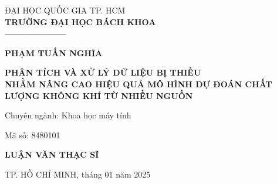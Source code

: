 \singlespacing
\begin{boxA}
\begin{titlepage}
\vspace{1em}

\begin{center}
    \fontsize{14}{20}\selectfont
    ĐẠI HỌC QUỐC GIA TP. HCM \\
    \bf TRƯỜNG ĐẠI HỌC BÁCH KHOA \\
  --------------------



\end{center}

\vspace{4em}

\begin{center}
    \fontsize{15}{20}\selectfont
    \textbf{PHẠM TUẤN NGHĨA} \\
\end{center}



\vspace{4em}
\begin{center}
    \fontsize{17}{25}\selectfont
    \textbf{PHÂN TÍCH VÀ XỬ LÝ DỮ LIỆU BỊ THIẾU}\\
    \textbf{NHẰM NÂNG CAO HIỆU QUẢ MÔ HÌNH DỰ ĐOÁN CHẤT LƯỢNG KHÔNG KHÍ TỪ NHIỀU NGUỒN} \\
\end{center}
\vspace{2em}

\hspace{6em}Chuyên ngành: Khoa học máy tính

\hspace{6em}Mã số: 8480101

\vspace{4em}

\begin{center}
    \fontsize{21}{20}\selectfont
    \textbf{LUẬN VĂN THẠC SĨ} \\
\end{center}


\vspace{10em}

\begin{center}
\fontsize{12}{20}\selectfont
    TP. HỒ CHÍ MINH, tháng 01 năm 2025 \\
\end{center}
\end{titlepage}
\end{boxA}
\onehalfspacing